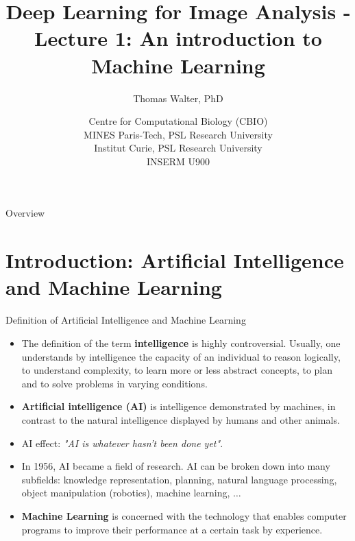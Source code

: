 \documentclass[xcolor=pdftex,dvipsnames,table]{beamer}
\title{Deep Learning for Image Analysis - \\ 
	   Lecture 1: An introduction to Machine Learning}
\author{Thomas Walter, PhD}
\date{Centre for Computational Biology (CBIO) \\
	  MINES Paris-Tech, PSL Research University \\
	  Institut Curie, PSL Research University \\
	  INSERM U900}
\begin{document}
\begin{frame}
\titlepage
\end{frame}

\begin{frame}{Overview}
\tableofcontents
\end{frame}

\section{Introduction: Artificial Intelligence and Machine Learning}

\begin{frame}{Definition of Artificial Intelligence and Machine Learning}
\begin{itemize}
	\item The definition of the term \textbf{intelligence} is highly controversial. Usually, one understands by intelligence the capacity of an individual to reason logically, to understand complexity, to learn more or less abstract concepts, to plan and to solve problems in varying conditions. 	
	\item \textbf{Artificial intelligence (AI)} is intelligence demonstrated by machines, in contrast to the natural intelligence displayed by humans and other animals. 
	\item AI effect: \emph{"AI is whatever hasn't been done yet"}.
	\item In 1956, AI became a field of research. AI can be broken down into many subfields: knowledge representation, planning, natural language processing, object manipulation (robotics), machine learning, $\ldots$
	\item \textbf{Machine Learning} is concerned with the technology that enables computer programs to improve their performance at a certain task by experience.
\end{itemize}
\end{frame}
\end{document}
